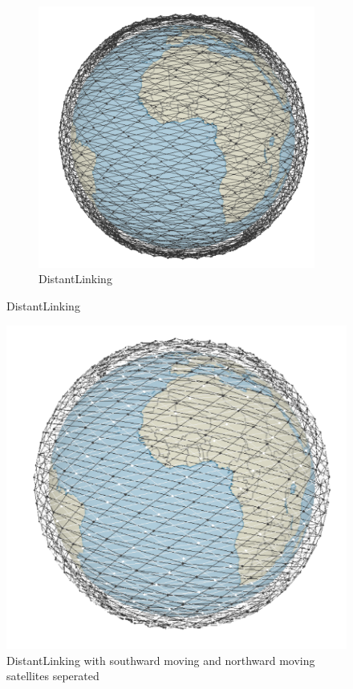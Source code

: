 \documentclass[12pt,a4paper,twoside,openright]{report}
\begin{document}
\begin{figure}
\begin{subfigure}[b]{0.3\textwidth}
	\end{subfigure}
	\hfill
	\begin{subfigure}[b]{0.3\textwidth}
		\caption{DistantLinking}
		\includegraphics[width=\textwidth]{DistantLinking}
	\end{subfigure}
\end{figure}


\begin{figure}
	\centering
	\caption{DistantLinking with southward moving and northward moving satellites seperated}
	\label{fig:DistantLinking}
	\includegraphics[width=\textwidth]{DistantLinking2}
\end{figure}
\end{document}
